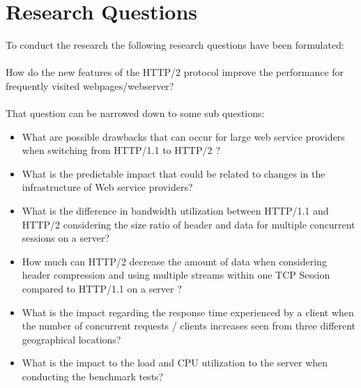 \section{Research Questions}
\label{chap:rq}
To conduct the research the following research questions have been formulated: \\
\\
How do the new features of the  HTTP/2 protocol improve the performance for frequently visited webpages/webserver? 
\\
\\
That question can be narrowed down to some sub questions:

\begin{itemize}
\item What are possible drawbacks that can occur for large web service providers when switching from HTTP/1.1 to HTTP/2 ?
\item What is the predictable impact that could be related to changes in the infrastructure of Web service providers?
\item What is the difference in bandwidth utilization between HTTP/1.1 and HTTP/2 considering the size ratio of header and data for multiple concurrent sessions on a server?
\item How much can HTTP/2 decrease the amount of data when considering header compression and using multiple streams within one TCP Session compared to HTTP/1.1 on a server ?
\item What is the impact regarding the response time experienced by a client when the number of concurrent requests / clients increases seen from three different geographical locations?
\item What is the impact to the load and CPU utilization to the server when conducting the benchmark tests?
\end{itemize}